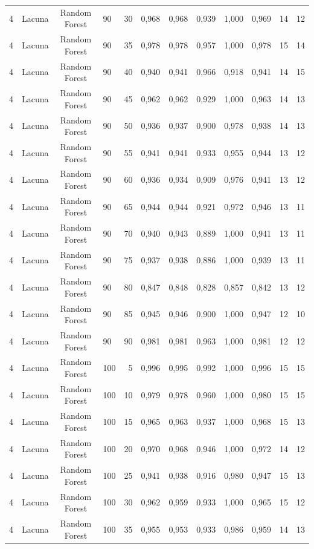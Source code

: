 \begin{longtable}{ccclrrrrrrrr}
4 & Lacuna & Random Forest & 90 & 30 & 0,968 & 0,968 & 0,939 & 1,000 & 0,969 & 14 & 12 \\
4 & Lacuna & Random Forest & 90 & 35 & 0,978 & 0,978 & 0,957 & 1,000 & 0,978 & 15 & 14 \\
4 & Lacuna & Random Forest & 90 & 40 & 0,940 & 0,941 & 0,966 & 0,918 & 0,941 & 14 & 15 \\
4 & Lacuna & Random Forest & 90 & 45 & 0,962 & 0,962 & 0,929 & 1,000 & 0,963 & 14 & 13 \\
4 & Lacuna & Random Forest & 90 & 50 & 0,936 & 0,937 & 0,900 & 0,978 & 0,938 & 14 & 13 \\
4 & Lacuna & Random Forest & 90 & 55 & 0,941 & 0,941 & 0,933 & 0,955 & 0,944 & 13 & 12 \\
4 & Lacuna & Random Forest & 90 & 60 & 0,936 & 0,934 & 0,909 & 0,976 & 0,941 & 13 & 12 \\
4 & Lacuna & Random Forest & 90 & 65 & 0,944 & 0,944 & 0,921 & 0,972 & 0,946 & 13 & 11 \\
4 & Lacuna & Random Forest & 90 & 70 & 0,940 & 0,943 & 0,889 & 1,000 & 0,941 & 13 & 11 \\
4 & Lacuna & Random Forest & 90 & 75 & 0,937 & 0,938 & 0,886 & 1,000 & 0,939 & 13 & 11 \\
4 & Lacuna & Random Forest & 90 & 80 & 0,847 & 0,848 & 0,828 & 0,857 & 0,842 & 13 & 12 \\
4 & Lacuna & Random Forest & 90 & 85 & 0,945 & 0,946 & 0,900 & 1,000 & 0,947 & 12 & 10 \\
4 & Lacuna & Random Forest & 90 & 90 & 0,981 & 0,981 & 0,963 & 1,000 & 0,981 & 12 & 12 \\
4 & Lacuna & Random Forest & 100 & 5 & 0,996 & 0,995 & 0,992 & 1,000 & 0,996 & 15 & 15 \\
4 & Lacuna & Random Forest & 100 & 10 & 0,979 & 0,978 & 0,960 & 1,000 & 0,980 & 15 & 15 \\
4 & Lacuna & Random Forest & 100 & 15 & 0,965 & 0,963 & 0,937 & 1,000 & 0,968 & 15 & 13 \\
4 & Lacuna & Random Forest & 100 & 20 & 0,970 & 0,968 & 0,946 & 1,000 & 0,972 & 14 & 12 \\
4 & Lacuna & Random Forest & 100 & 25 & 0,941 & 0,938 & 0,916 & 0,980 & 0,947 & 15 & 13 \\
4 & Lacuna & Random Forest & 100 & 30 & 0,962 & 0,959 & 0,933 & 1,000 & 0,965 & 15 & 12 \\
4 & Lacuna & Random Forest & 100 & 35 & 0,955 & 0,953 & 0,933 & 0,986 & 0,959 & 14 & 13 \\

\end{longtable}

